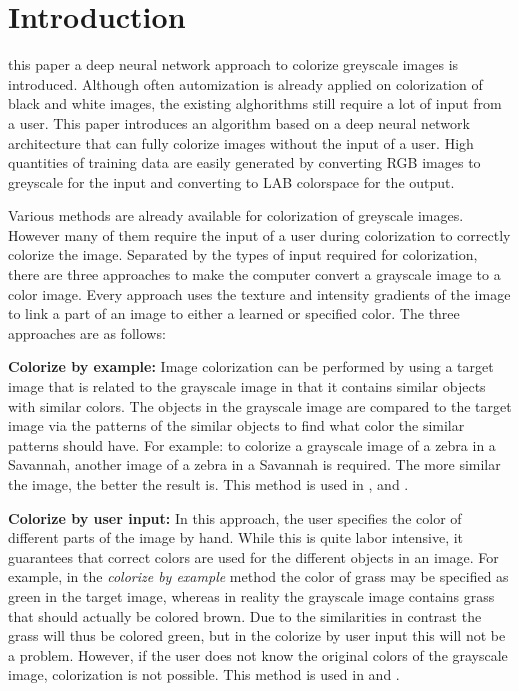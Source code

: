 \section{Introduction}\label{sec:into}

 this paper a deep neural network approach to colorize greyscale images is introduced. Although often automization is already applied on colorization of black and white images, the existing alghorithms still require a lot of input from a user. This paper introduces an algorithm based on a deep neural network architecture that can fully colorize images without the input of a user. High quantities of training data are easily generated by converting RGB images to greyscale for the input and converting to LAB colorspace for the output. 

Various methods are already available for colorization of greyscale images. However many of them require the input of a user during colorization to correctly colorize the image. Separated by the types of input required for colorization, there are three approaches to make the computer convert a grayscale image to a color image. Every approach uses the texture and intensity gradients of the image to link a part of an image to either a learned or specified color. The three approaches are as follows:

\textbf{Colorize by example:} Image colorization can be performed by using a target image that is related to the grayscale image in that it contains similar objects with similar colors. The objects in the grayscale image are compared to the target image via the patterns of the similar objects to find what color the similar patterns should have. For example: to colorize a grayscale image of a zebra in a Savannah, another image of a zebra in a Savannah is required. The more similar the image, the better the result is. This method is used in \cite{Charpiat}, \cite{Gupta} and \cite{Zheng}.

\textbf{Colorize by user input:} In this approach, the user specifies the color of different parts of the image by hand. While this is quite labor intensive, it guarantees that correct colors are used for the different objects in an image. For example, in the \textit{colorize by example} method the color of grass may be specified as green in the target image, whereas in reality the grayscale image contains grass that should actually be colored brown. Due to the similarities in contrast the grass will thus be colored green, but in the colorize by user input this will not be a problem. However, if the user does not know the original colors of the grayscale image, colorization is not possible. This method is used in \cite{Horiuchi} and \cite{Levin}.

